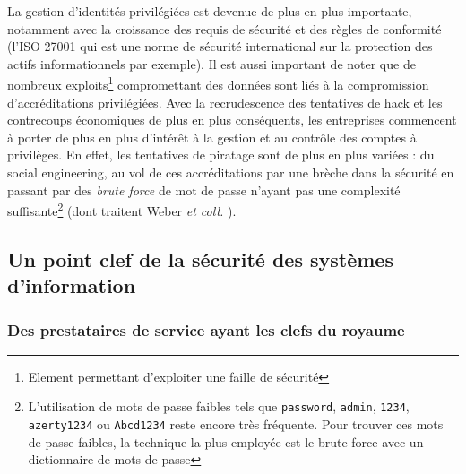 La gestion d’identités privilégiées est devenue de plus en plus importante, notamment avec la croissance des requis de sécurité et des règles de conformité (l’ISO 27001 qui est une norme de sécurité international sur la protection des actifs informationnels par exemple). Il est aussi important de noter que de nombreux exploits\footnote{Element permettant d'exploiter une faille de sécurité} compromettant des données sont liés à la compromission d’accréditations privilégiées. Avec la recrudescence des tentatives de hack et les contrecoups économiques de plus en plus conséquents, les entreprises commencent à porter de plus en plus d’intérêt à la gestion et au contrôle des comptes à privilèges. En effet, les tentatives de piratage sont de plus en plus variées : du social engineering, au vol de ces accréditations par une brèche dans la sécurité en passant par des \textit{brute force} de mot de passe n’ayant pas une complexité suffisante\footnote{L'utilisation de mots de passe faibles tels que \texttt{password}, \texttt{admin}, \texttt{1234}, \texttt{azerty1234} ou \texttt{Abcd1234} reste encore très fréquente. Pour trouver ces mots de passe faibles, la technique la plus employée est le brute force avec un dictionnaire de mots de passe} (dont traitent Weber \emph{et coll.} \cite{jew}).\\

\subsection{Un point clef de la sécurité des systèmes d'information}

\subsubsection{Des prestataires de service ayant les clefs du royaume}
\label{par:presta_kingdom}


